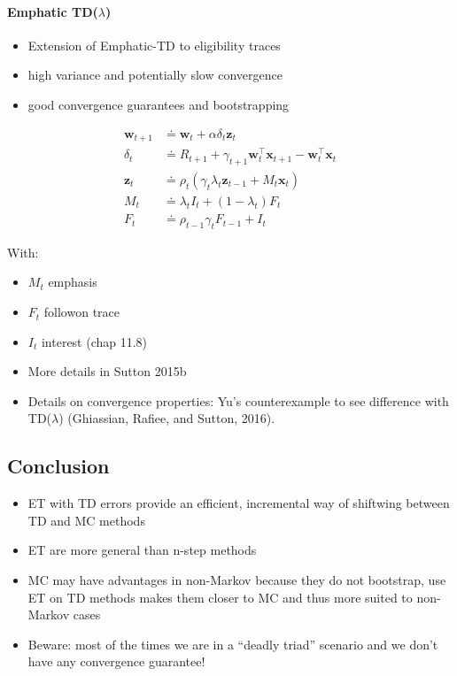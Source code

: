 \documentclass[sutton_barto_notes.tex]{subfiles}
\begin{document}
\paragraph{Emphatic TD($\lambda$)}
\begin{itemize}
\item Extension of Emphatic-TD to eligibility traces 
\item high variance and potentially slow convergence 
\item good convergence guarantees and bootstrapping 
\end{itemize}

 
\begin{align}
\mathbf{w}_{t+1} & \doteq \mathbf{w}_t + \alpha \delta_t \mathbf{z}_t \label{eq:12.44}\tag{12.44}\\
\delta_{t} & \doteq R_{t+1} + \gamma_{t+1} \mathbf{w}_t^{\top} \mathbf{x}_{t+1} -  \mathbf{w}_t^{\top} \mathbf{x}_{t}\label{eq:12.45}\tag{12.45}\\
\mathbf{z}_{t} & \doteq \rho_t(\gamma_t \lambda_t \mathbf{z}_{t-1} + M_t \mathbf{x}_t) \label{eq:12.46}\tag{12.46}\\
M_{t} & \doteq \lambda_t I_t + (1 - \lambda_t) F_t \label{eq:12.47}\tag{12.47}\\
F_{t} & \doteq \rho_{t-1} \gamma_t F_{t-1} + I_t \label{eq:12.48}\tag{12.48}
\end{align} 

 With: 
\begin{itemize}
\item $M_t$ emphasis 
\item $F_t$ followon trace 
\item $I_t$ interest (chap 11.8)   
\item More details in Sutton 2015b 
\item Details on convergence properties: Yu’s counterexample to see difference with TD($\lambda$) (Ghiassian, Rafiee, and Sutton, 2016). 
\end{itemize}

\subsection{Conclusion}

\begin{itemize}
\item ET with TD errors provide an efficient, incremental way of shiftwing between TD and MC methods 
\item ET are more general than n-step methods 
\item MC may have advantages in non-Markov because they do not bootstrap, use ET on TD methods makes them closer to MC and thus more suited to non-Markov cases 
\item Beware: most of the times we are in a “deadly triad” scenario and we don’t have any convergence guarantee! 
\end{itemize}
\end{document}
